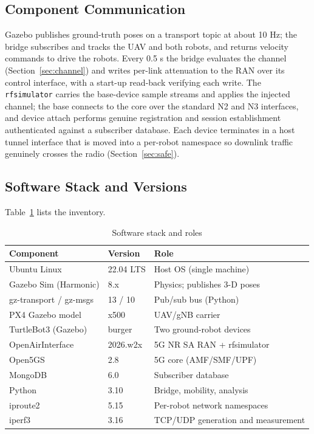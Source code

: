 \documentclass[conference]{IEEEtran}
\begin{document}
\subsection{Component Communication}
Gazebo publishes ground-truth poses on a transport topic at about 10 Hz; the bridge
subscribes and tracks the UAV and both robots, and returns velocity commands to drive
the robots. Every 0.5 s the bridge evaluates the channel (Section~\ref{sec:channel})
and writes per-link attenuation to the RAN over its control interface, with a
start-up read-back verifying each write. The \texttt{rfsimulator} carries the
base-device sample streams and applies the injected channel; the base connects to the
core over the standard N2 and N3 interfaces, and device attach performs genuine
registration and session establishment authenticated against a subscriber database.
Each device terminates in a host tunnel interface that is moved into a per-robot
namespace so downlink traffic genuinely crosses the radio (Section~\ref{sec:safe}).

\subsection{Software Stack and Versions}
Table~\ref{tab:software} lists the inventory.

\begin{table}[t]
\caption{Software stack and roles}
\label{tab:software}
\centering
\footnotesize
\begin{tabular}{@{}lll@{}}
\toprule
\textbf{Component} & \textbf{Version} & \textbf{Role} \\
\midrule
Ubuntu Linux & 22.04 LTS & Host OS (single machine) \\
Gazebo Sim (Harmonic) & 8.x & Physics; publishes 3-D poses \\
gz-transport / gz-msgs & 13 / 10 & Pub/sub bus (Python) \\
PX4 Gazebo model & x500 & UAV/gNB carrier \\
TurtleBot3 (Gazebo) & burger & Two ground-robot devices \\
OpenAirInterface & 2026.w2x & 5G NR SA RAN + rfsimulator \\
Open5GS & 2.8 & 5G core (AMF/SMF/UPF) \\
MongoDB & 6.0 & Subscriber database \\
Python & 3.10 & Bridge, mobility, analysis \\
iproute2 & 5.15 & Per-robot network namespaces \\
iperf3 & 3.16 & TCP/UDP generation and measurement \\
\bottomrule
\end{tabular}
\end{table}
\end{document}
